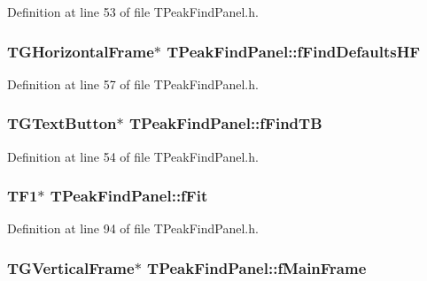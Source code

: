 Definition at line 53 of file TPeakFindPanel.h.

\subsubsection[{fFindDefaultsHF}]{\setlength{\rightskip}{0pt plus 5cm}TGHorizontalFrame$\ast$ {\bf TPeakFindPanel::fFindDefaultsHF}\hspace{0.3cm}{\ttfamily  [private]}}\label{classTPeakFindPanel_a6487341a98d29539bba3638b20e27a7b}


Definition at line 57 of file TPeakFindPanel.h.

\subsubsection[{fFindTB}]{\setlength{\rightskip}{0pt plus 5cm}TGTextButton$\ast$ {\bf TPeakFindPanel::fFindTB}\hspace{0.3cm}{\ttfamily  [private]}}\label{classTPeakFindPanel_ac803c9c73a8f00c37b14db60570344e5}


Definition at line 54 of file TPeakFindPanel.h.

\subsubsection[{fFit}]{\setlength{\rightskip}{0pt plus 5cm}TF1$\ast$ {\bf TPeakFindPanel::fFit}\hspace{0.3cm}{\ttfamily  [protected]}}\label{classTPeakFindPanel_ab3da441de579dbe67bf5195eaf862c55}


Definition at line 94 of file TPeakFindPanel.h.

\subsubsection[{fMainFrame}]{\setlength{\rightskip}{0pt plus 5cm}TGVerticalFrame$\ast$ {\bf TPeakFindPanel::fMainFrame}\hspace{0.3cm}{\ttfamily  [private]}}\label{classTPeakFindPanel_af76ba4a366293e953618a4dc3590fa5c}


